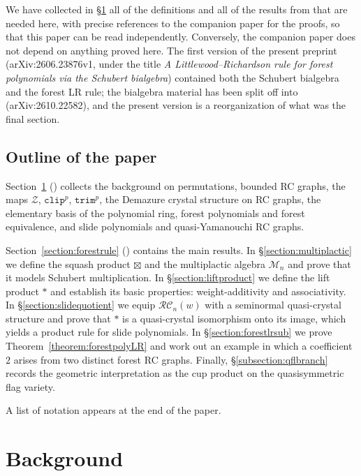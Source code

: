 \documentclass{amsart}
\theoremstyle{definition}
\theoremstyle{remark}
\numberwithin{equation}{subsection}
\newcommand{\trm}{\mathtt{trim}}
\newcommand{\zeromap}{\mathcal{Z}}
\newcommand{\clp}{\mathtt{clip}}
\newcommand{\RC}{\mathcal{RC}}
\begin{document}
We have collected in \S\ref{section:background} all of the definitions and all of the results from \cite{samuelbialgebra} that are needed here, with precise references to the companion paper for the proofs, so that this paper can be read independently. Conversely, the companion paper does not depend on anything proved here. The first version of the present preprint (arXiv:2606.23876v1, under the title \emph{A Littlewood--Richardson rule for forest polynomials via the Schubert bialgebra}) contained both the Schubert bialgebra and the forest LR rule; the bialgebra material has been split off into \cite{samuelbialgebra} (arXiv:2610.22582), and the present version is a reorganization of what was the final section.

\subsection*{Outline of the paper}

Section~\ref{section:background} () collects the background on permutations, bounded RC graphs, the maps $\zeromap$, $\clp^p$, $\trm^p$, the Demazure crystal structure on RC graphs, the elementary basis of the polynomial ring, forest polynomials and forest equivalence, and slide polynomials and quasi-Yamanouchi RC graphs.

Section~\ref{section:forestrule} () contains the main results. In \S\ref{section:multiplactic} we define the squash product $\boxtimes$ and the multiplactic algebra $\mathcal{M}_n$ and prove that it models Schubert multiplication. In \S\ref{section:liftproduct} we define the lift product $*$ and establish its basic properties: weight-additivity and associativity. In \S\ref{section:slidequotient} we equip $\RC_n(w)$ with a seminormal quasi-crystal structure and prove that $*$ is a quasi-crystal isomorphism onto its image, which yields a product rule for slide polynomials. In \S\ref{section:forestlrsub} we prove Theorem~\ref{theorem:forestpolyLR} and work out an example in which a coefficient $2$ arises from two distinct forest RC graphs. Finally, \S\ref{subsection:qflbranch} records the geometric interpretation as the cup product on the quasisymmetric flag variety.

A list of notation appears at the end of the paper.


\section{Background}\label{section:background}
\end{document}
